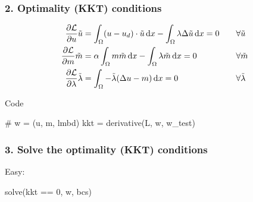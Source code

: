 \begin{frame}[fragile]
  \frametitle{2. Optimality (KKT) conditions}

  \begin{equation*}
    \begin{aligned}
        \frac{\partial \mathcal L}{\partial u}\tilde u &= \int_\Omega (u - u_d)\cdot \tilde u\dx - \int_\Omega \lambda \Delta \tilde u \dx = 0 \quad && \forall \tilde u\\ %
        \frac{\partial \mathcal L}{\partial m}\tilde m &= \alpha \int_\Omega m \tilde m\dx - \int_\Omega \lambda \tilde m \dx = 0 && \forall \tilde m\\
        \frac{\partial \mathcal L}{\partial \lambda}\tilde \lambda &= \int_\Omega - \tilde \lambda (\Delta u - m) \dx = 0  && \forall \tilde \lambda \\
    \end{aligned}
  \end{equation*}

  \begin{block}{Code}
\begin{python}
# w = (u, m, lmbd)
kkt = derivative(L, w, w_test)
\end{python}
\end{block}
\end{frame}


\begin{frame}[fragile]
  \frametitle{3. Solve the optimality (KKT) conditions}
      Easy:
\begin{python}
    solve(kkt == 0, w, bcs)
\end{python}

\end{frame}
